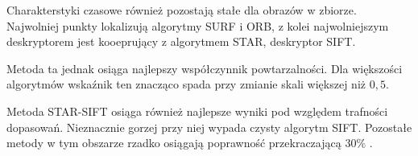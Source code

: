Charakterstyki czasowe również pozostają stałe dla obrazów w zbiorze. Najwolniej punkty lokalizują algorytmy SURF i ORB, z kolei najwolniejszym deskryptorem jest kooeprujący z algorytmem STAR, deskryptor SIFT.

Metoda ta jednak osiąga najlepszy współczynnik powtarzalności. Dla większości algorytmów wskaźnik ten znacząco spada przy zmianie skali większej niż $0,5$.

Metoda STAR-SIFT osiąga również najlepsze wyniki pod względem trafności dopasowań. Nieznacznie gorzej przy niej wypada czysty algorytm SIFT. Pozostałe metody w tym obszarze rzadko osiągają poprawność przekraczającą $30\% $ .

